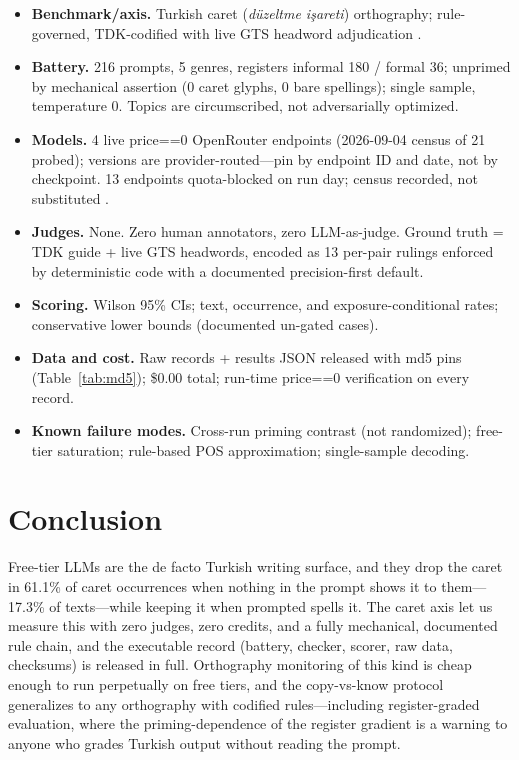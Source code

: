 \documentclass[11pt]{article}
\begin{document}
\begin{itemize}
\item \textbf{Benchmark/axis.} Turkish caret (\emph{d{\"u}zeltme i{\c s}areti}) orthography; rule-governed, TDK-codified \cite{tdk2012} with live GTS headword adjudication \cite{gts2026}.
\item \textbf{Battery.} 216 prompts, 5 genres, registers informal 180 / formal 36; unprimed by mechanical assertion (0 caret glyphs, 0 bare spellings); single sample, temperature 0. Topics are circumscribed, not adversarially optimized.
\item \textbf{Models.} 4 live price==0 OpenRouter endpoints (2026-09-04 census of 21 probed); versions are provider-routed---pin by endpoint ID and date, not by checkpoint. 13 endpoints quota-blocked on run day; census recorded, not substituted \cite{openrouter2026}.
\item \textbf{Judges.} None. Zero human annotators, zero LLM-as-judge. Ground truth = TDK guide + live GTS headwords, encoded as 13 per-pair rulings enforced by deterministic code with a documented precision-first default.
\item \textbf{Scoring.} Wilson 95\% CIs; text, occurrence, and exposure-conditional rates; conservative lower bounds (documented un-gated cases).
\item \textbf{Data and cost.} Raw records + results JSON released with md5 pins (Table~\ref{tab:md5}); \$0.00 total; run-time price==0 verification on every record.
\item \textbf{Known failure modes.} Cross-run priming contrast (not randomized); free-tier saturation; rule-based POS approximation; single-sample decoding.
\end{itemize}

\section{Conclusion}

Free-tier LLMs are the de facto Turkish writing surface, and they drop the caret in 61.1\% of caret occurrences when nothing in the prompt shows it to them---17.3\% of texts---while keeping it when prompted spells it. The caret axis let us measure this with zero judges, zero credits, and a fully mechanical, documented rule chain, and the executable record (battery, checker, scorer, raw data, checksums) is released in full. Orthography monitoring of this kind is cheap enough to run perpetually on free tiers, and the copy-vs-know protocol generalizes to any orthography with codified rules---including register-graded evaluation, where the priming-dependence of the register gradient is a warning to anyone who grades Turkish output without reading the prompt.
\end{document}
